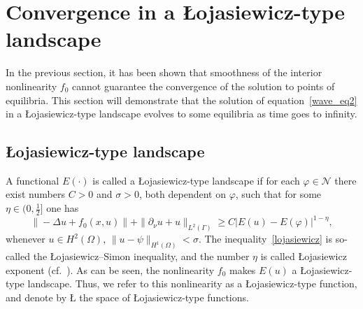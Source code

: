 \documentclass{elsarticle}
\begin{document}
\section{Convergence in a {\L}ojasiewicz-type landscape}
\label{sec:convergence}

In the previous section, it has been shown that smoothness of the interior nonlinearity $f_0$ cannot guarantee the convergence of the solution to points of equilibria. This section will demonstrate that the solution of equation~\eqref{wave_eq2} in a {\L}ojasiewicz-type landscape evolves to some equilibria as time goes to infinity.

\subsection{{\L}ojasiewicz-type landscape}
\label{sec:lojasiewicz}
A functional $E(\cdot)$ is called a {\L}ojasiewicz-type landscape if for each $\varphi\in\mathcal{N}$ there exist numbers $C>0$ and $\sigma >0$, both dependent on $\varphi$, such that for some $\eta\in(0, \frac{1}{2}]$ one has
\begin{equation}\label{lojasiewicz}
	\|- \Delta u +f_0(x, u)  \| + \| \partial_{\nu} u + u\|_{L^{2}(\Gamma)}\geqslant C|E(u) -E(\varphi)|^{1-\eta},
\end{equation}
whenever $u\in H^2(\Omega)$, $\|u-\psi\|_{H^1(\Omega)} < \sigma$. The inequality~\eqref{lojasiewicz} is so-called the {\L}ojasiewicz--Simon inequality, and the number $\eta$ is called {\L}ojasiewicz exponent (cf.~\cite{Hao2006, chill2003lojasiewicz, haraux2003rate}).
As can be seen, the nonlinearity $f_0$ makes $E(u)$ a {\L}ojasiewicz-type landscape. Thus, we refer to this nonlinearity as a {\L}ojasiewicz-type function, and denote by {\L} the space of {\L}ojasiewicz-type functions.
\end{document}
